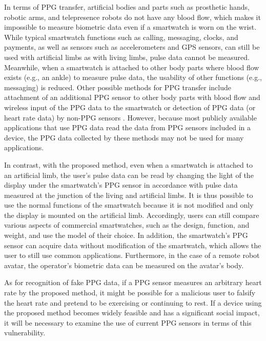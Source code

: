 \documentclass{ieeeaccess}
\begin{document}
In terms of PPG transfer, artificial bodies and parts such as prosthetic hands, robotic arms, and telepresence robots do not have any blood flow, which makes it impossible to measure biometric data even if a smartwatch is worn on the wrist. While typical smartwatch functions such as calling, messaging, clocks, and payments, as well as sensors such as accelerometers and GPS sensors, can still be used with artificial limbs as with living limbs, pulse data cannot be measured. Meanwhile, when a smartwatch is attached to other body parts where blood flow exists (e.g., an ankle) to measure pulse data, the usability of other functions (e.g., messaging) is reduced. Other possible methods for PPG transfer include attachment of an additional PPG sensor to other body parts with blood flow and wireless input of the PPG data to the smartwatch or detection of PPG data (or heart rate data) by non-PPG sensors \cite{heart_rate_accelerometer, Biowatch, SeismoTracker, heart_rate_ecg, heart_rate_touchscreen}. However, because most publicly available applications that use PPG data read the data from PPG sensors included in a device, the PPG data collected by these methods may not be used for many applications.\par

In contrast, with the proposed method, even when a smartwatch is attached to an artificial limb, the user's pulse data can be read by changing the light of the display under the smartwatch's PPG sensor in accordance with pulse data measured at the junction of the living and artificial limbs. It is thus possible to use the normal functions of the smartwatch because it is not modified and only the display is mounted on the artificial limb. Accordingly, users can still compare various aspects of commercial smartwatches, such as the design, function, and weight, and use the model of their choice. In addition, the smartwatch's PPG sensor can acquire data without modification of the smartwatch, which allows the user to still use common applications. Furthermore, in the case of a remote robot avatar, the operator's biometric data can be measured on the avatar's body.\par

As for recognition of fake PPG data, if a PPG sensor measures an arbitrary heart rate by the proposed method, it might be possible for a malicious user to falsify the heart rate and pretend to be exercising or continuing to rest. If a device using the proposed method becomes widely feasible and has a significant social impact, it will be necessary to examine the use of current PPG sensors in terms of this vulnerability.\par
\end{document}
